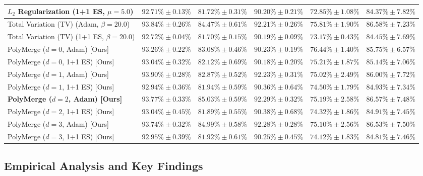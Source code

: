 \begin{table}[t]
\begin{center}
\begin{footnotesize}
\begin{sc}
\begin{tabular}{lccccc}
$L_2$ Regularization (1+1 ES, $\mu=5.0$) & $92.71\% \pm 0.13\%$ & $81.72\% \pm 0.31\%$ & $90.20\% \pm 0.21\%$ & $72.85\% \pm 1.08\%$ & $84.37\% \pm 7.82\%$ \\
\midrule
Total Variation (TV) (Adam, $\beta=20.0$) & $\mathbf{93.84\% \pm 0.26\%}$ & $84.47\% \pm 0.61\%$ & $92.21\% \pm 0.26\%$ & $75.81\% \pm 1.90\%$ & $\mathbf{86.58\% \pm 7.23\%}$ \\
Total Variation (TV) (1+1 ES, $\beta=20.0$) & $92.72\% \pm 0.04\%$ & $81.70\% \pm 0.15\%$ & $90.19\% \pm 0.09\%$ & $73.17\% \pm 0.43\%$ & $84.45\% \pm 7.69\%$ \\
\midrule
PolyMerge ($d=0$, Adam) [Ours] & $93.26\% \pm 0.22\%$ & $83.08\% \pm 0.46\%$ & $90.23\% \pm 0.19\%$ & $\mathbf{76.44\% \pm 1.40\%}$ & $85.75\% \pm 6.57\%$ \\
PolyMerge ($d=0$, 1+1 ES) [Ours] & $93.04\% \pm 0.32\%$ & $82.12\% \pm 0.69\%$ & $90.18\% \pm 0.20\%$ & $75.21\% \pm 1.87\%$ & $85.14\% \pm 7.06\%$ \\
\midrule
PolyMerge ($d=1$, Adam) [Ours] & $93.90\% \pm 0.28\%$ & $82.87\% \pm 0.52\%$ & $92.23\% \pm 0.31\%$ & $75.02\% \pm 2.49\%$ & $86.00\% \pm 7.72\%$ \\
PolyMerge ($d=1$, 1+1 ES) [Ours] & $92.94\% \pm 0.36\%$ & $81.94\% \pm 0.59\%$ & $90.36\% \pm 0.64\%$ & $74.50\% \pm 1.79\%$ & $84.93\% \pm 7.34\%$ \\
\midrule
\textbf{PolyMerge ($d=2$, Adam) [Ours]} & $93.77\% \pm 0.33\%$ & $\mathbf{85.03\% \pm 0.59\%}$ & $\mathbf{92.29\% \pm 0.32\%}$ & $75.19\% \pm 2.58\%$ & $86.57\% \pm 7.48\%$ \\
PolyMerge ($d=2$, 1+1 ES) [Ours] & $93.04\% \pm 0.45\%$ & $81.89\% \pm 0.55\%$ & $90.38\% \pm 0.68\%$ & $74.32\% \pm 1.86\%$ & $84.91\% \pm 7.45\%$ \\
\midrule
PolyMerge ($d=3$, Adam) [Ours] & $93.74\% \pm 0.32\%$ & $84.99\% \pm 0.58\%$ & $92.28\% \pm 0.28\%$ & $75.10\% \pm 2.56\%$ & $86.53\% \pm 7.50\%$ \\
PolyMerge ($d=3$, 1+1 ES) [Ours] & $92.95\% \pm 0.39\%$ & $81.92\% \pm 0.61\%$ & $90.25\% \pm 0.45\%$ & $74.12\% \pm 1.83\%$ & $84.81\% \pm 7.46\%$ \\
\bottomrule
\end{tabular}
\end{sc}
\end{footnotesize}
\end{center}
\vskip -0.1in
\end{table}

\subsection{Empirical Analysis and Key Findings}

